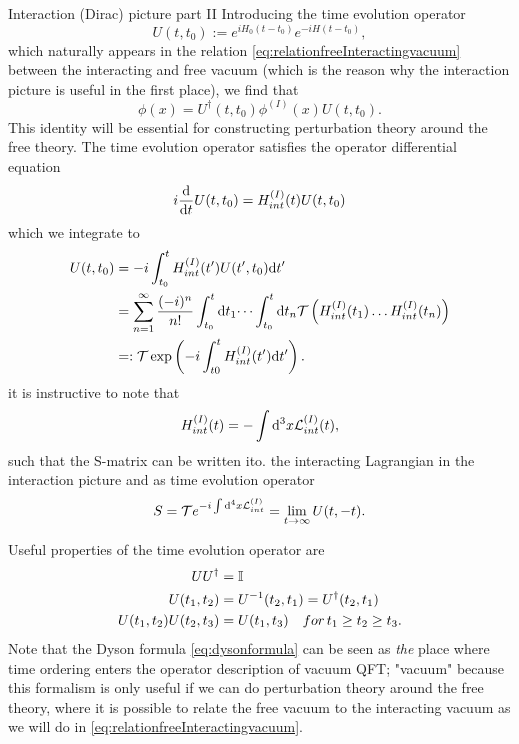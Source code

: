 \begin{mybox}{Interaction (Dirac) picture part II}
Introducing the time evolution operator
\begin{equation}
	U(t,t_0) := e^{i H_0 (t-t_0)} e^{-i H(t-t_0)},
\end{equation}
which naturally appears in the relation \ref{eq:relationfreeInteractingvacuum} between the interacting and free vacuum (which is the reason why the interaction picture is useful in the first place), we find that
\begin{equation}
	\phi(x) = U^\dagger(t,t_0) \phi^{(I)} (x) U(t,t_0).
\end{equation}
This identity will be essential for constructing perturbation theory around the free theory. The time evolution operator satisfies the operator differential equation
\begin{equation}
	i\frac{\mathrm{d}}{\mathrm{d} t} U(t,t_0) = H^{(I)}_{int} (t) U(t,t_0)
\end{equation}
which we integrate to
\begin{align}
	\label{eq:dysonformula}
	U(t,t_0) &= - i \int_{t_0}^t H^{(I)}_{int} (t^\prime) U(t^\prime, t_0) \mathrm{d} t^\prime \nonumber\\
	&=\sum_{n=1}^{\infty} \frac{(-i)^n}{n!} \int_{t_0}^{t} \mathrm{d} t_1 \dots \int_{t_0}^t \mathrm{d} t_n \mathcal{T}\left(H^{(I)}_{int}(t_1)\dots H^{(I)}_{int}(t_n)\right)\nonumber\\
	&=:\mathcal{T} \exp\left(-i \int_{t0}^t H^{(I)}_{int} (t^\prime) \mathrm{d} t^\prime\right).
\end{align}
it is instructive to note that
\begin{equation}
H^{(I)}_{int}(t) = -\int \mathrm{d}^3 x \mathcal{L}^{(I)}_{int}(t),
\end{equation}
such that the S-matrix can be written ito. the interacting Lagrangian in the interaction picture and as time evolution operator
\begin{equation}
	S= \mathcal{T} e^{-i \int \mathrm{d}^4x \mathcal{L}^{(I)}_{int}} = \lim_{t\rightarrow\infty} U(t,-t).
\end{equation}
\end{mybox}
Useful properties of the time evolution operator are
\begin{align}
	UU^\dagger &= \mathbb{I} \\
	U(t_1,t_2) &= U^{-1}(t_2,t_1) = U^\dagger(t_2,t_1)\\
	U(t_1,t_2)U(t_2,t_3) &= U(t_1,t_3) \quad for\, t_1 \geq t_2\geq t_3.
\end{align}
Note that the Dyson formula \ref{eq:dysonformula} can be seen as \emph{the} place where time ordering enters the operator description of vacuum QFT; "vacuum" because this formalism is only useful if we can do perturbation theory around the free theory, where it is possible to relate the free vacuum to the interacting vacuum as we will do in \ref{eq:relationfreeInteractingvacuum}.\\
